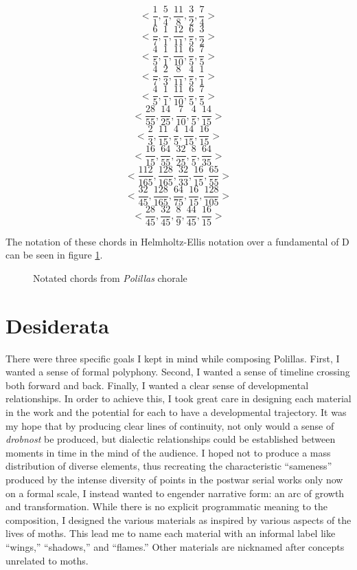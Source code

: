 \[
<\frac{1}{1}, \frac{5}{4}, \frac{11}{8}, \frac{3}{2}, \frac{7}{4}>
\]
\[
<\frac{6}{7}, \frac{1}{1}, \frac{12}{11}, \frac{6}{5}, \frac{3}{2}>
\]
\[
<\frac{4}{5}, \frac{1}{1}, \frac{11}{10}, \frac{6}{5}, \frac{7}{5}>
\]
\[
<\frac{4}{7}, \frac{2}{3}, \frac{8}{11}, \frac{4}{5}, \frac{1}{1}>
\]
\[
<\frac{4}{5}, \frac{1}{1}, \frac{11}{10}, \frac{6}{5}, \frac{7}{5}>
\]
\[
<\frac{28}{55}, \frac{14}{25}, \frac{7}{10}, \frac{4}{5}, \frac{14}{15}>
\]
\[
<\frac{2}{3}, \frac{11}{15}, \frac{4}{5}, \frac{14}{15}, \frac{16}{15}>
\]
\[
<\frac{16}{15}, \frac{64}{55}, \frac{32}{25}, \frac{8}{5}, \frac{64}{35}>
\]
\[
<\frac{112}{165}, \frac{128}{165}, \frac{32}{33}, \frac{16}{15}, \frac{65}{55}>
\]
\[
<\frac{32}{45}, \frac{128}{165}, \frac{64}{75}, \frac{16}{15}, \frac{128}{105}>
\]
\[
<\frac{28}{45}, \frac{32}{45}, \frac{8}{9}, \frac{44}{45}, \frac{16}{15}>
\]

The notation of these chords in Helmholtz-Ellis notation over a fundamental of D can be seen in figure \ref{fig:ji-chords}.

\begin{figure}[H]
    \caption{Notated chords from \textit{Polillas} chorale}
    \label{fig:ji-chords}
\end{figure}

\section{Desiderata}

There were three specific goals I kept in mind while composing Polillas. First, I wanted a sense of formal polyphony. Second, I wanted a sense of timeline crossing both forward and back. Finally, I wanted a clear sense of developmental relationships. In order to achieve this, I took great care in designing each material in the work and the potential for each to have a developmental trajectory. It was my hope that by producing clear lines of continuity, not only would a sense of \textit{drobnost} be produced, but dialectic relationships could be established between moments in time in the mind of the audience. I hoped not to produce a mass distribution of diverse elements, thus recreating the characteristic ``sameness'' produced by the intense diversity of points in the postwar serial works only now on a formal scale, I instead wanted to engender narrative form: an arc of growth and transformation. While there is no explicit programmatic meaning to the composition, I designed the various materials as inspired by various aspects of the lives of moths. This lead me to name each material with an informal label like ``wings,'' ``shadows,'' and ``flames.'' Other materials are nicknamed after concepts unrelated to moths.

